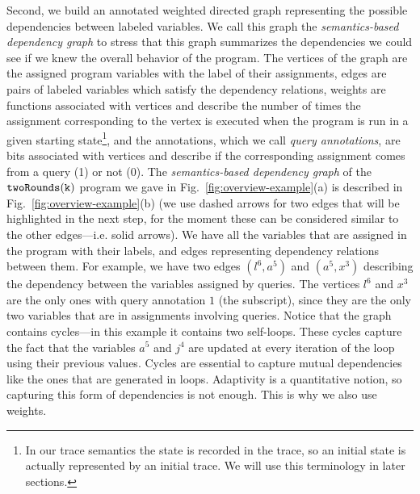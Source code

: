 Second, we build an annotated weighted directed graph representing the possible dependencies between labeled variables. We call this graph the \emph{semantics-based dependency graph} to stress that this graph summarizes the dependencies we could see if we knew the overall behavior of the program. 
The vertices of the graph are the assigned program variables with the label of their assignments, edges are pairs of labeled variables which satisfy the dependency relations, weights are functions associated with vertices and describe the number of times the assignment corresponding to the vertex is executed when the program is run in a given starting state\footnote{In our trace semantics the state is recorded in the trace, so an initial state is actually represented by an initial trace. We will use this terminology in later sections.}, and the annotations, which we call \emph{query annotations}, are bits associated with vertices and describe if the corresponding assignment comes from a query (1) or not (0).
The \emph{semantics-based dependency graph} of the $\mathtt{twoRounds(k)}$ program
we gave in Fig.~\ref{fig:overview-example}(a) is described in Fig.~\ref{fig:overview-example}(b) (we use dashed arrows for two edges that will be highlighted in the next step, for the moment these can be considered similar to the other edges---i.e. solid arrows).
We have all the variables that are assigned in the program with their labels, and edges representing dependency relations between them. 
For example, we have two edges $(l^6, a^5)$ and $(a^5, x^3)$ describing the dependency between the variables assigned by queries. The vertices $l^6$ and $x^3$ are the only ones with query annotation $1$ (the subscript), since they are the only two variables that are in assignments involving  queries. Notice that the graph contains cycles---in this example it contains two self-loops. These cycles capture the fact that the variables $a^5$ and $j^4$ are updated at every iteration of the loop using their previous values. Cycles are essential to capture mutual dependencies like the ones that are generated in loops. Adaptivity is a quantitative notion, so capturing this form of dependencies is not enough. 
This is why we also use weights. 
